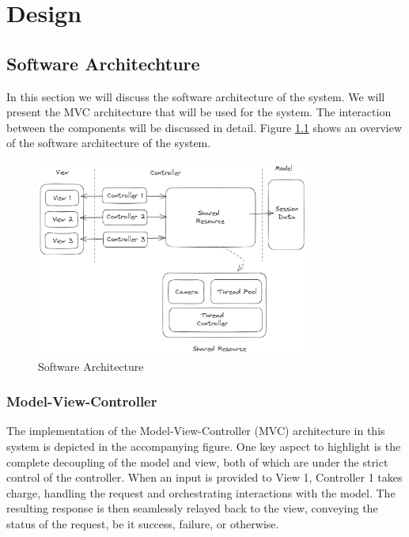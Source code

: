 \chapter{Design}
\label{chapter:design}

\section{Software Architechture}
\label{sec:software-architechture}

In this section we will discuss the software architecture of the system. We will present the MVC architecture that will be used for the system. The interaction between the components will be discussed in detail. Figure \ref{fig:architechture} shows an overview of the software architecture of the system.

\begin{figure}[!ht]
    \centering
    \includegraphics[width=0.8\textwidth]{texs/Part2/chapter3/image/architecture.png}
    \caption{Software Architecture}
    \label{fig:architechture}
\end{figure}

\subsection{Model-View-Controller}
\label{subsec:model-view-controller}

The implementation of the Model-View-Controller (MVC) architecture in this system is depicted in the accompanying figure. One key aspect to highlight is the complete decoupling of the model and view, both of which are under the strict control of the controller. When an input is provided to View 1, Controller 1 takes charge, handling the request and orchestrating interactions with the model. The resulting response is then seamlessly relayed back to the view, conveying the status of the request, be it success, failure, or otherwise.

